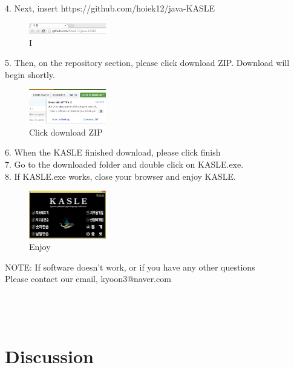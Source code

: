 \documentclass[10pt,journal,compsoc]{IEEEtran}
\begin{document}
4. Next, insert https://github.com/hoiek12/java-KASLE\\

\begin{figure}[H]
\centering
\includegraphics[width=0.3\textwidth]{Download5.png}
{\caption*{I }}
\end{figure}
5. Then, on the repository section, please click download ZIP. Download will begin shortly.\\

\begin{figure}[H]
\centering
\includegraphics[width=0.3\textwidth]{Download6.png}
{\caption*{Click download ZIP }}
\end{figure}
6. When the KASLE finished download, please click finish\\
7. Go to the downloaded folder and double click on KASLE.exe. \\
8. If KASLE.exe works, close your browser and enjoy KASLE.\\
\begin{figure}[H]
\centering
\includegraphics[width=0.3\textwidth]{mainpage.png}
{\caption*{Enjoy }}
\end{figure}
NOTE: If software doesn't work, or if you have any other questions \\
Please contact our email, kyoon3@naver.com\\
\\\\\\
\ifCLASSOPTIONcompsoc
{}
\else
\section{Discussion}
\label{sec:Discussion}
\fi
\end{document}
